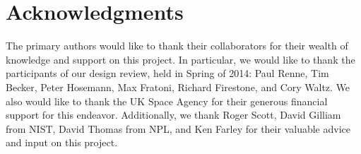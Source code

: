 \documentclass{mc2015}
\begin{document}
 

\section{Acknowledgments}

The primary authors would like to thank their collaborators for their wealth of knowledge and support on this project. In particular, we would like to thank the participants of our design review, held in Spring of 2014: Paul Renne, Tim Becker, Peter Hosemann, Max Fratoni, Richard Firestone, and Cory Waltz. We also would like to thank the UK Space Agency for their generous financial support for this endeavor. Additionally, we thank Roger Scott, David Gilliam from NIST, David Thomas from NPL, and Ken Farley for their valuable advice and input on this project. 

\setlength{\baselineskip}{12pt}




\end{document}
